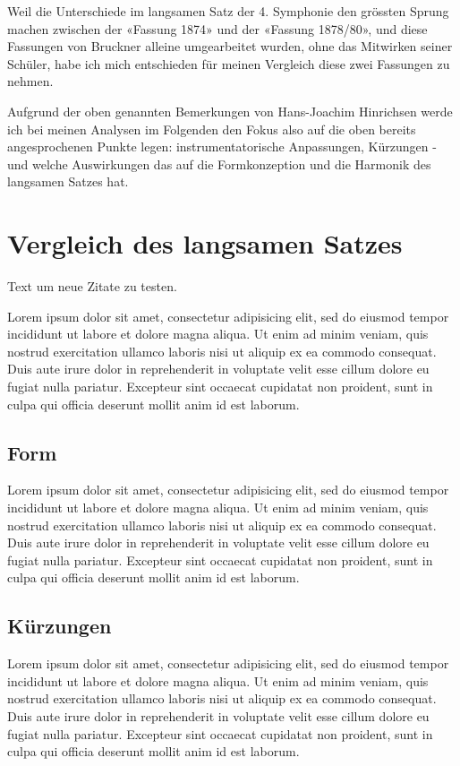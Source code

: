 Weil die Unterschiede im langsamen Satz der 4. Symphonie den grössten Sprung machen zwischen der «Fassung 1874» und der «Fassung 1878/80», und diese Fassungen von Bruckner alleine umgearbeitet wurden, ohne das Mitwirken seiner Schüler, habe ich mich entschieden für meinen Vergleich diese zwei Fassungen zu nehmen.

Aufgrund der oben genannten Bemerkungen von Hans-Joachim Hinrichsen werde ich bei meinen Analysen im Folgenden den Fokus also auf die oben bereits angesprochenen Punkte legen: instrumentatorische Anpassungen, Kürzungen - und welche Auswirkungen das auf die Formkonzeption und die Harmonik des langsamen Satzes hat. %


\section{Vergleich des langsamen Satzes}

Text um neue\autocite{roeder:bruckner} Zitate\autocite{heinze:bruckner} zu testen.

Lorem ipsum dolor sit amet, consectetur adipisicing elit, sed do eiusmod tempor incididunt ut labore et dolore magna aliqua. Ut enim ad minim veniam, quis nostrud exercitation ullamco laboris nisi ut aliquip ex ea commodo consequat. Duis aute irure dolor in reprehenderit in voluptate velit esse cillum dolore eu fugiat nulla pariatur. Excepteur sint occaecat cupidatat non proident, sunt in culpa qui officia deserunt mollit anim id est laborum.


\subsection{Form}

Lorem ipsum dolor sit amet, consectetur adipisicing elit, sed do eiusmod tempor incididunt ut labore et dolore magna aliqua. Ut enim ad minim veniam, quis nostrud exercitation ullamco laboris nisi ut aliquip ex ea commodo consequat. Duis aute irure dolor in reprehenderit in voluptate velit esse cillum dolore eu fugiat nulla pariatur. Excepteur sint occaecat cupidatat non proident, sunt in culpa qui officia deserunt mollit anim id est laborum.

\subsection{Kürzungen}

Lorem ipsum dolor sit amet, consectetur adipisicing elit, sed do eiusmod tempor incididunt ut labore et dolore magna aliqua. Ut enim ad minim veniam, quis nostrud exercitation ullamco laboris nisi ut aliquip ex ea commodo consequat. Duis aute irure dolor in reprehenderit in voluptate velit esse cillum dolore eu fugiat nulla pariatur. Excepteur sint occaecat cupidatat non proident, sunt in culpa qui officia deserunt mollit anim id est laborum.

